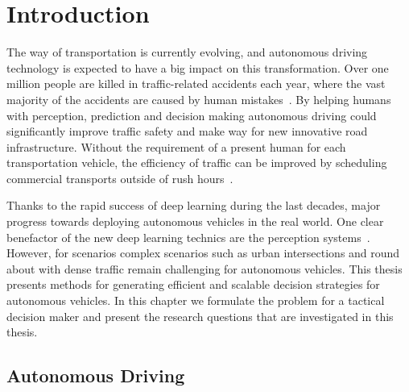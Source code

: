 \chapter{Introduction}\label{chapter:intro}
The way of transportation is currently evolving, and autonomous driving technology is expected to have a big impact on this transformation. Over one million people are killed in traffic-related accidents each year, where the vast majority of the accidents are caused by human mistakes~\cite{WHO2018, NHTSA2018}. By helping humans with perception, prediction and decision making autonomous driving could significantly improve traffic safety and make way for new innovative road infrastructure. Without the requirement of a present human for each transportation vehicle, the efficiency of traffic can be improved by scheduling commercial transports outside of rush hours~\cite{FAGNANT2015167}.



Thanks to the rapid success of deep learning during the last decades, major progress towards deploying autonomous vehicles in the real world. One clear benefactor of the new deep learning technics are the perception systems~\cite{Janai2020}. 
However, for scenarios complex scenarios such as urban intersections and round about with dense traffic remain challenging for autonomous vehicles. 
This thesis presents methods for generating efficient and scalable decision strategies for autonomous vehicles. In this chapter we formulate the problem for a tactical decision maker and present the research questions that are investigated in this thesis. 

\section{Autonomous Driving}

